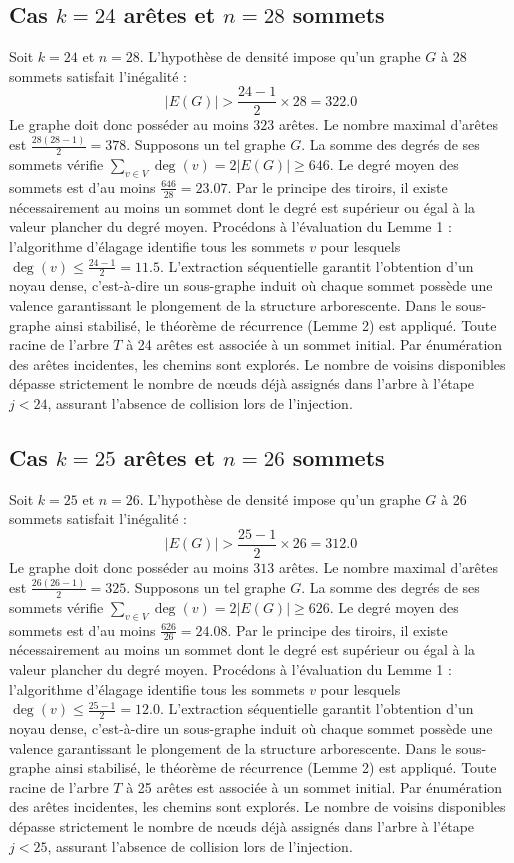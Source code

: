 \documentclass[12pt,a4paper]{article}
\begin{document}
\subsection{Cas $k = 24$ arêtes et $n = 28$ sommets}
Soit $k = 24$ et $n = 28$. L'hypothèse de densité impose qu'un graphe $G$ à 28 sommets satisfait l'inégalité :
$$ |E(G)| > \frac{24-1}{2} \times 28 = 322.0 $$
Le graphe doit donc posséder au moins $323$ arêtes. Le nombre maximal d'arêtes est $\frac{28(28-1)}{2} = 378$.
Supposons un tel graphe $G$. La somme des degrés de ses sommets vérifie $\sum_{v \in V} \deg(v) = 2|E(G)| \geq 646$.
Le degré moyen des sommets est d'au moins $\frac{646}{28} = 23.07$.
Par le principe des tiroirs, il existe nécessairement au moins un sommet dont le degré est supérieur ou égal à la valeur plancher du degré moyen.
Procédons à l'évaluation du Lemme 1 : l'algorithme d'élagage identifie tous les sommets $v$ pour lesquels $\deg(v) \leq \frac{24-1}{2} = 11.5$.
L'extraction séquentielle garantit l'obtention d'un noyau dense, c'est-à-dire un sous-graphe induit où chaque sommet possède une valence garantissant le plongement de la structure arborescente.
Dans le sous-graphe ainsi stabilisé, le théorème de récurrence (Lemme 2) est appliqué. Toute racine de l'arbre $T$ à 24 arêtes est associée à un sommet initial. Par énumération des arêtes incidentes, les chemins sont explorés. Le nombre de voisins disponibles dépasse strictement le nombre de nœuds déjà assignés dans l'arbre à l'étape $j < 24$, assurant l'absence de collision lors de l'injection.

\subsection{Cas $k = 25$ arêtes et $n = 26$ sommets}
Soit $k = 25$ et $n = 26$. L'hypothèse de densité impose qu'un graphe $G$ à 26 sommets satisfait l'inégalité :
$$ |E(G)| > \frac{25-1}{2} \times 26 = 312.0 $$
Le graphe doit donc posséder au moins $313$ arêtes. Le nombre maximal d'arêtes est $\frac{26(26-1)}{2} = 325$.
Supposons un tel graphe $G$. La somme des degrés de ses sommets vérifie $\sum_{v \in V} \deg(v) = 2|E(G)| \geq 626$.
Le degré moyen des sommets est d'au moins $\frac{626}{26} = 24.08$.
Par le principe des tiroirs, il existe nécessairement au moins un sommet dont le degré est supérieur ou égal à la valeur plancher du degré moyen.
Procédons à l'évaluation du Lemme 1 : l'algorithme d'élagage identifie tous les sommets $v$ pour lesquels $\deg(v) \leq \frac{25-1}{2} = 12.0$.
L'extraction séquentielle garantit l'obtention d'un noyau dense, c'est-à-dire un sous-graphe induit où chaque sommet possède une valence garantissant le plongement de la structure arborescente.
Dans le sous-graphe ainsi stabilisé, le théorème de récurrence (Lemme 2) est appliqué. Toute racine de l'arbre $T$ à 25 arêtes est associée à un sommet initial. Par énumération des arêtes incidentes, les chemins sont explorés. Le nombre de voisins disponibles dépasse strictement le nombre de nœuds déjà assignés dans l'arbre à l'étape $j < 25$, assurant l'absence de collision lors de l'injection.
\end{document}
